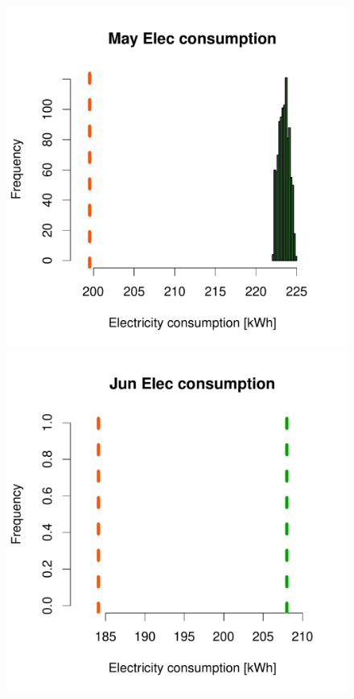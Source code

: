 \documentclass[a4paper, 12pt]{article}
\begin{document}
\begin{figure}
 \includegraphics[width=\scale]{Simulation_histograms/Batch_2_Only/Elec_Runs/May_Elec}
 \includegraphics[width=\scale]{Simulation_histograms/Batch_2_Only/Elec_Runs/Jun_Elec}\\

\end{figure}
\end{document}
